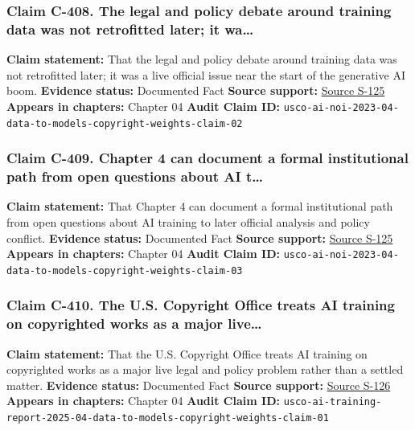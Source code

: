 \documentclass[
  american,
  11pt,
  letterpaper,
]{article}
\begin{document}
\subsubsection{Claim C-408. The legal and policy debate around training
data was not retrofitted later; it
wa\ldots{}}\label{claim-c-408-the-legal-and-policy-debate-around-training-data-was-not-retrofitted-later-it-wa}

\textbf{Claim statement:} That the legal and policy debate around
training data was not retrofitted later; it was a live official issue
near the start of the generative AI boom. \textbf{Evidence status:}
Documented Fact \textbf{Source support:}
\hyperref[source-s-125-copyright-and-artificial-intelligence-notice-of-inquiry]{Source
S-125} \textbf{Appears in chapters:} Chapter 04 \textbf{Audit Claim ID:}
\texttt{usco-ai-noi-2023-04-data-to-models-copyright-weights-claim-02}

\subsubsection{Claim C-409. Chapter 4 can document a formal
institutional path from open questions about AI
t\ldots{}}\label{claim-c-409-chapter-4-can-document-a-formal-institutional-path-from-open-questions-about-ai-t}

\textbf{Claim statement:} That Chapter 4 can document a formal
institutional path from open questions about AI training to later
official analysis and policy conflict. \textbf{Evidence status:}
Documented Fact \textbf{Source support:}
\hyperref[source-s-125-copyright-and-artificial-intelligence-notice-of-inquiry]{Source
S-125} \textbf{Appears in chapters:} Chapter 04 \textbf{Audit Claim ID:}
\texttt{usco-ai-noi-2023-04-data-to-models-copyright-weights-claim-03}

\subsubsection{Claim C-410. The U.S. Copyright Office treats AI training
on copyrighted works as a major
live\ldots{}}\label{claim-c-410-the-u-s-copyright-office-treats-ai-training-on-copyrighted-works-as-a-major-live}

\textbf{Claim statement:} That the U.S. Copyright Office treats AI
training on copyrighted works as a major live legal and policy problem
rather than a settled matter. \textbf{Evidence status:} Documented Fact
\textbf{Source support:}
\hyperref[source-s-126-copyright-and-artificial-intelligence-part-3-generative-ai-training-pre-publication-version]{Source
S-126} \textbf{Appears in chapters:} Chapter 04 \textbf{Audit Claim ID:}
\texttt{usco-ai-training-report-2025-04-data-to-models-copyright-weights-claim-01}
\end{document}
